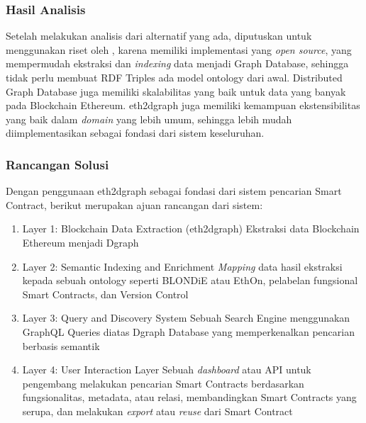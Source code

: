 
\subsubsection{Hasil Analisis}

Setelah melakukan analisis dari alternatif yang ada, diputuskan untuk menggunakan riset oleh \cite{aimar2023extraction}, karena memiliki implementasi yang \textit{open source}, yang mempermudah ekstraksi dan \textit{indexing} data menjadi Graph Database, sehingga tidak perlu membuat RDF Triples ada model ontology dari awal. Distributed Graph Database juga memiliki skalabilitas yang baik untuk data yang banyak pada Blockchain Ethereum. eth2dgraph juga memiliki kemampuan ekstensibilitas yang baik dalam \textit{domain} yang lebih umum, sehingga lebih mudah diimplementasikan sebagai fondasi dari sistem keseluruhan. 

\subsubsection{Rancangan Solusi}

Dengan penggunaan eth2dgraph sebagai fondasi dari sistem pencarian Smart Contract, berikut merupakan ajuan rancangan dari sistem:

\begin{enumerate}
  \item Layer 1: Blockchain Data Extraction (eth2dgraph) \newline Ekstraksi data Blockchain Ethereum menjadi Dgraph
  \item Layer 2: Semantic Indexing and Enrichment \newline \textit{Mapping} data hasil ekstraksi kepada sebuah ontology seperti BLONDiE atau EthOn, pelabelan fungsional Smart Contracts, dan Version Control
  \item Layer 3: Query and Discovery System \newline Sebuah Search Engine menggunakan GraphQL Queries diatas Dgraph Database yang memperkenalkan pencarian berbasis semantik
  \item Layer 4: User Interaction Layer \newline Sebuah \textit{dashboard} atau API untuk pengembang melakukan pencarian Smart Contracts berdasarkan fungsionalitas, metadata, atau relasi, membandingkan Smart Contracts yang serupa, dan melakukan \textit{export} atau \textit{reuse} dari Smart Contract 
\end{enumerate}
